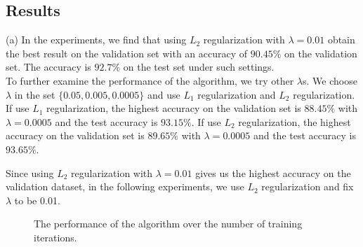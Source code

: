 \documentclass{article} %
\begin{document}
\subsection{Results}
(a) In the experiments, we find that using $L_2$ regularization with $\lambda = 0.01$ obtain the best result on the validation set with an accuracy of $90.45\%$ on the validation set. The accuracy is $92.7\%$ on the test set under such settings. \\

To further examine the performance of the algorithm, we try other $\lambda$s. We choose $\lambda$ in the set $\{0.05,0.005,0.0005\}$ and use $L_1$ regularization and $L_2$ regularization. If use $L_1$ regularization, the highest accuracy on the validation set is $88.45\%$ with $\lambda = 0.0005$ and the test accuracy is $93.15\%$. If use $L_2$ regularization, the highest accuracy on the validation set is $89.65\%$ with $\lambda = 0.0005$ and the test accuracy is $93.65\%$. 

Since using $L_2$ regularization with $\lambda = 0.01$ gives us the highest accuracy on the validation dataset, in the following experiments, we use $L_2$ regularization and fix $\lambda$ to be 0.01.

\begin{figure}[t]%
	\centering
	\qquad
	\caption{The performance of the algorithm over the number of training iterations. }%
\end{figure}
\end{document}
